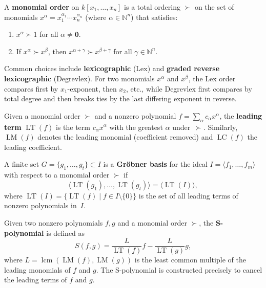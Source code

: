 \begin{definition}\label{def:monomial_order}
A \textbf{monomial order} on $k[x_1, \dots, x_n]$ is a total ordering $\succ$ on the set of monomials $x^{\alpha} = x_1^{\alpha_1} \cdots x_n^{\alpha_n}$ (where $\alpha \in \mathbb{N}^n$) that satisfies:
\begin{enumerate}
    \item $x^{\alpha} \succ 1$ for all $\alpha \neq \mathbf{0}$.
    \item If $x^{\alpha} \succ x^{\beta}$, then $x^{\alpha + \gamma} \succ x^{\beta + \gamma}$ for all $\gamma \in \mathbb{N}^n$.
\end{enumerate}
Common choices include \textbf{lexicographic} (Lex) and \textbf{graded reverse lexicographic} (Degrevlex). For two monomials $x^{\alpha}$ and $x^{\beta}$, the Lex order compares first by $x_1$-exponent, then $x_2$, etc., while Degrevlex first compares by total degree and then breaks ties by the last differing exponent in reverse.
\end{definition}

\begin{definition}\label{def:leading_term}
Given a monomial order $\succ$ and a nonzero polynomial $f = \sum_{\alpha} c_{\alpha} x^{\alpha}$, the \textbf{leading term} $\operatorname{LT}(f)$ is the term $c_{\alpha} x^{\alpha}$ with the greatest $\alpha$ under~$\succ$. Similarly, $\operatorname{LM}(f)$ denotes the leading monomial (coefficient removed) and $\operatorname{LC}(f)$ the leading coefficient.
\end{definition}

\begin{definition}\label{def:grobner_basis}
A finite set $G = \{g_1, \dots, g_t\} \subset I$ is a \textbf{Gr\"obner basis} for the ideal $I = \langle f_1, \dots, f_m \rangle$ with respect to a monomial order $\succ$ if
\[
\langle \operatorname{LT}(g_1), \dots, \operatorname{LT}(g_t) \rangle = \langle \operatorname{LT}(I) \rangle,
\]
where $\operatorname{LT}(I) = \{\operatorname{LT}(f) \mid f \in I \setminus \{0\}\}$ is the set of all leading terms of nonzero polynomials in~$I$.
\end{definition}

\begin{definition}[S-Polynomial]\label{def:s_polynomial}
Given two nonzero polynomials $f, g$ and a monomial order $\succ$, the \textbf{S-polynomial} is defined as
\[
S(f, g) = \frac{L}{\operatorname{LT}(f)} f - \frac{L}{\operatorname{LT}(g)} g,
\]
where $L = \operatorname{lcm}(\operatorname{LM}(f), \operatorname{LM}(g))$ is the least common multiple of the leading monomials of $f$ and $g$. The S-polynomial is constructed precisely to cancel the leading terms of $f$ and $g$.
\end{definition}

